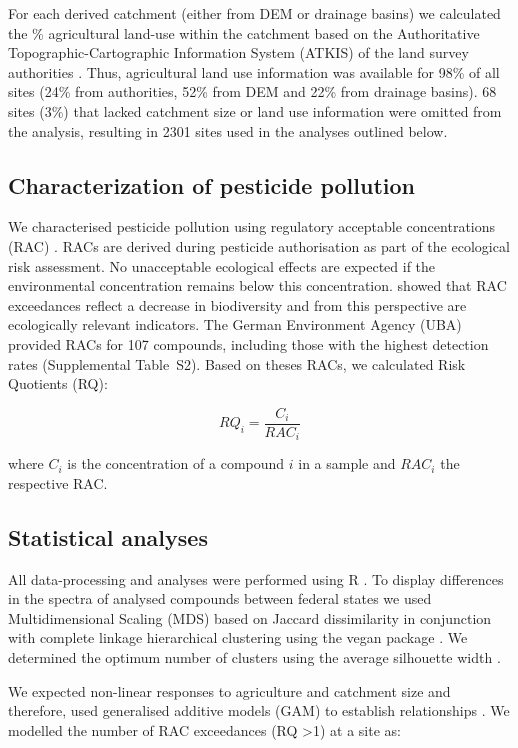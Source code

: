 For each derived catchment (either from DEM or drainage basins) we calculated the \% agricultural land-use within the catchment based on the Authoritative Topographic-Cartographic Information System (ATKIS) of the land survey authorities \citep{adv_atkis_2016}. 
Thus, agricultural land use information was available for 98\% of all sites (24\% from authorities, 52\% from DEM and 22\% from drainage basins). 
68 sites (3\%) that lacked catchment size or land use information were omitted from the analysis, resulting in 2301 sites used in the analyses outlined below.


\subsection{Characterization of pesticide pollution}
We characterised pesticide pollution using regulatory acceptable concentrations (RAC) \citep{brock_linking_2010}.
RACs are derived during pesticide authorisation as part of the ecological risk assessment.
No unacceptable ecological effects are expected if the environmental concentration remains below this concentration.
\citet{stehle_pesticide_2015} showed that RAC exceedances reflect a decrease in biodiversity and from this perspective are ecologically relevant indicators. 
The German Environment Agency (UBA) provided RACs for 107 compounds, including those with the highest detection rates (Supplemental Table~S2). 
Based on theses RACs, we calculated Risk Quotients (RQ):

\begin{equation}
RQ_i = \frac{C_i}{RAC_i}
\end{equation}

where $C_i$ is the concentration of a compound $i$ in a sample and $RAC_i$ the respective RAC.


\subsection{Statistical analyses}
All data-processing and analyses were performed using R \citep{r_core_team_r:_2016}.
To display differences in the spectra of analysed compounds between federal states we used Multidimensional Scaling (MDS) based on Jaccard dissimilarity in conjunction with complete linkage hierarchical clustering using the vegan package \citep{oksanen_vegan:_2016}.
We determined the optimum number of clusters using the average silhouette width \citep{rousseeuw1987silhouettes}. 

We expected non-linear responses to agriculture and catchment size and therefore, used generalised additive models (GAM) to establish relationships \citep{fewster_analysis_2000}.
We modelled the number of RAC exceedances (RQ \textgreater 1) at a site as:


